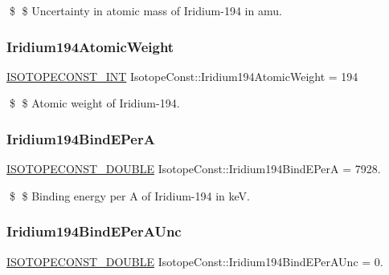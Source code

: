 \$ \$ Uncertainty in atomic mass of Iridium-\/194 in amu. \mbox{\label{group___isotope_const-_iridium-_ir194_gaae148cd5ffe0af28205e002675c1c9d3}} 
\subsubsection{\texorpdfstring{Iridium194\+Atomic\+Weight}{Iridium194AtomicWeight}}
{\footnotesize\ttfamily \mbox{\hyperlink{group___isotope_const-_macros_ga5f18360b3e99483a35c32d789e62621c}{I\+S\+O\+T\+O\+P\+E\+C\+O\+N\+S\+T\+\_\+\+I\+NT}} Isotope\+Const\+::\+Iridium194\+Atomic\+Weight = 194}

\$ \$ Atomic weight of Iridium-\/194. \mbox{\label{group___isotope_const-_iridium-_ir194_ga6b1d1433016e63d43790202ecfeb76af}} 
\subsubsection{\texorpdfstring{Iridium194\+Bind\+E\+PerA}{Iridium194BindEPerA}}
{\footnotesize\ttfamily \mbox{\hyperlink{group___isotope_const-_macros_ga8f45a7272ce02c0b4c65c44636ed719a}{I\+S\+O\+T\+O\+P\+E\+C\+O\+N\+S\+T\+\_\+\+D\+O\+U\+B\+LE}} Isotope\+Const\+::\+Iridium194\+Bind\+E\+PerA = 7928.}

\$ \$ Binding energy per A of Iridium-\/194 in keV. \mbox{\label{group___isotope_const-_iridium-_ir194_ga7e3eac3bb0920706e61759f4e42fafeb}} 
\subsubsection{\texorpdfstring{Iridium194\+Bind\+E\+Per\+A\+Unc}{Iridium194BindEPerAUnc}}
{\footnotesize\ttfamily \mbox{\hyperlink{group___isotope_const-_macros_ga8f45a7272ce02c0b4c65c44636ed719a}{I\+S\+O\+T\+O\+P\+E\+C\+O\+N\+S\+T\+\_\+\+D\+O\+U\+B\+LE}} Isotope\+Const\+::\+Iridium194\+Bind\+E\+Per\+A\+Unc = 0.}

